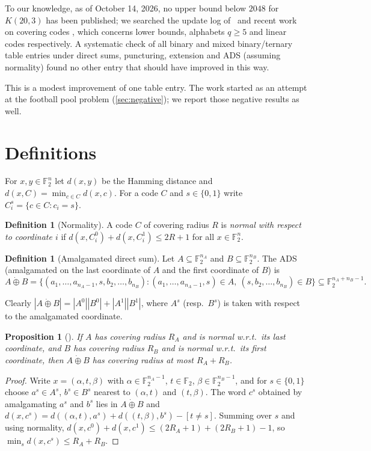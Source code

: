 \documentclass[11pt]{article}
\numberwithin{equation}{section}
\newtheorem{proposition}[theorem]{Proposition}
\theoremstyle{definition}
\newtheorem{definition}[theorem]{Definition}
\theoremstyle{remark}
\newcommand{\F}{\mathbb F}
\begin{document}
To our knowledge, as of October 14, 2026, no upper bound below $2048$ for $K(20,3)$ has been published;
we searched the update log of~\cite{Keri} and recent work on covering codes
\cite{GijswijtPolak25,Marosi26,DMP25}, which concerns lower bounds, alphabets $q\ge5$ and linear
codes respectively. A systematic check of all binary and mixed binary/ternary table entries under direct
sums, puncturing, extension and ADS (assuming normality) found no other entry that should have improved
in this way.

This is a modest improvement of one table entry. The work started as an attempt at the football pool
problem (\cref{sec:negative}); we report those negative results as well.

\section{Definitions}
For $x,y\in\F_2^n$ let $d(x,y)$ be the Hamming distance and $d(x,C)=\min_{c\in C}d(x,c)$.
For a code $C$ and $s\in\{0,1\}$ write $C_i^s=\{c\in C: c_i=s\}$.

\begin{definition}[Normality]
A code $C$ of covering radius $R$ is \emph{normal with respect to coordinate $i$} if
$d(x,C_i^0)+d(x,C_i^1)\le 2R+1$ for all $x\in\F_2^n$.
\end{definition}

\begin{definition}[Amalgamated direct sum]
Let $A\subseteq\F_2^{n_A}$ and $B\subseteq\F_2^{n_B}$. The ADS (amalgamated on the last coordinate of
$A$ and the first coordinate of $B$) is
\[
  A\dot\oplus B=\{(a_1,\dots,a_{n_A-1},s,b_2,\dots,b_{n_B}) :
  (a_1,\dots,a_{n_A-1},s)\in A,\ (s,b_2,\dots,b_{n_B})\in B\}\subseteq\F_2^{n_A+n_B-1}.
\]
\end{definition}
Clearly $|A\dot\oplus B|=|A^0||B^0|+|A^1||B^1|$, where $A^s$ (resp.\ $B^s$) is taken with respect to the
amalgamated coordinate.

\begin{proposition}[\cite{GS85,CLS86}]\label{prop:ads}
If $A$ has covering radius $R_A$ and is normal w.r.t.\ its last coordinate, and $B$ has covering radius
$R_B$ and is normal w.r.t.\ its first coordinate, then $A\dot\oplus B$ has covering radius at most
$R_A+R_B$.
\end{proposition}
\begin{proof}
Write $x=(\alpha,t,\beta)$ with $\alpha\in\F_2^{n_A-1}$, $t\in\F_2$, $\beta\in\F_2^{n_B-1}$, and
for $s\in\{0,1\}$ choose $a^s\in A^s$, $b^s\in B^s$ nearest to $(\alpha,t)$ and $(t,\beta)$. The word
$c^s$ obtained by amalgamating $a^s$ and $b^s$ lies in $A\dot\oplus B$ and
$d(x,c^s)=d((\alpha,t),a^s)+d((t,\beta),b^s)-[t\neq s]$. Summing over $s$ and using normality,
$d(x,c^0)+d(x,c^1)\le(2R_A+1)+(2R_B+1)-1$, so $\min_s d(x,c^s)\le R_A+R_B$.
\end{proof}
\end{document}
